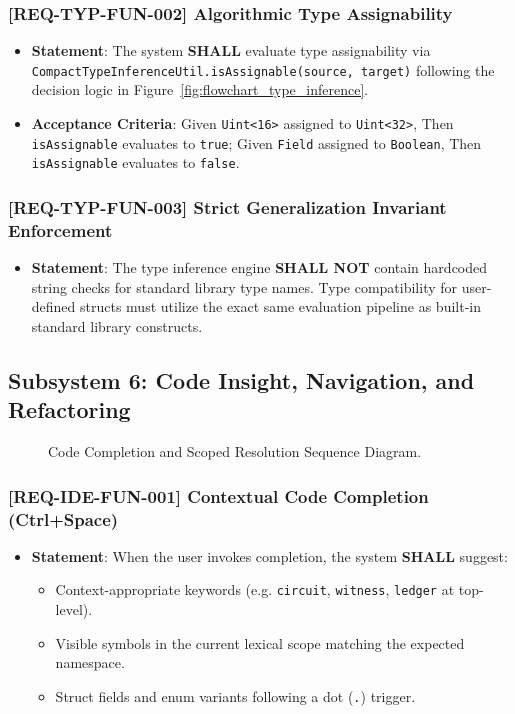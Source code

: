 \subsubsection{[REQ-TYP-FUN-002] Algorithmic Type Assignability}
\begin{itemize}
    \item \textbf{Statement}: The system \textbf{SHALL} evaluate type assignability via \texttt{CompactTypeInferenceUtil.isAssignable(source, target)} following the decision logic in Figure~\ref{fig:flowchart_type_inference}.
    \item \textbf{Acceptance Criteria}: Given \texttt{Uint<16>} assigned to \texttt{Uint<32>}, Then \texttt{isAssignable} evaluates to \texttt{true}; Given \texttt{Field} assigned to \texttt{Boolean}, Then \texttt{isAssignable} evaluates to \texttt{false}.
\end{itemize}

\subsubsection{[REQ-TYP-FUN-003] Strict Generalization Invariant Enforcement}
\begin{itemize}
    \item \textbf{Statement}: The type inference engine \textbf{SHALL NOT} contain hardcoded string checks for standard library type names. Type compatibility for user-defined structs must utilize the exact same evaluation pipeline as built-in standard library constructs.
\end{itemize}

\subsection{Subsystem 6: Code Insight, Navigation, and Refactoring}
\label{sec:subsystem_code_insight}

\begin{figure}[htbp]
    \centering
    
    \caption{Code Completion and Scoped Resolution Sequence Diagram.}
    \label{fig:sequence_completion}
\end{figure}

\subsubsection{[REQ-IDE-FUN-001] Contextual Code Completion (Ctrl+Space)}
\begin{itemize}
    \item \textbf{Statement}: When the user invokes completion, the system \textbf{SHALL} suggest:
    \begin{itemize}
        \item Context-appropriate keywords (e.g. \texttt{circuit}, \texttt{witness}, \texttt{ledger} at top-level).
        \item Visible symbols in the current lexical scope matching the expected namespace.
        \item Struct fields and enum variants following a dot (\texttt{.}) trigger.
    \end{itemize}
\end{itemize}

